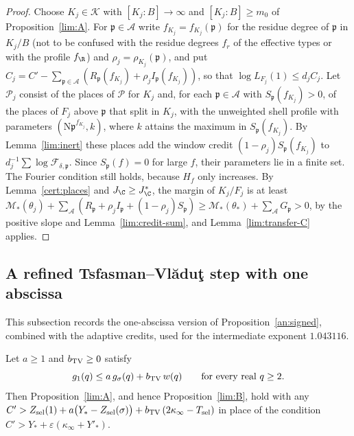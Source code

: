 \begin{proof}
Choose $K_j\in\mathcal K$ with $[K_j:B]\to\infty$ and $[K_j:B]\ge m_0$ of
Proposition~\ref{lim:A}. For $\mathfrak p\in\mathcal A$ write
$f_{K_j}=f_{K_j}(\mathfrak p)$ for the residue degree of $\mathfrak p$ in
$K_j/B$ (not to be confused with the residue degrees $f_r$ of the effective
types or with the profile $f_\R$) and $\rho_j=\rho_{K_j}(\mathfrak p)$, and
put $C_j=C'-\sum_{\mathfrak p\in\mathcal
A}(R_{\mathfrak p}(f_{K_j})+\rho_jI_{\mathfrak p}(f_{K_j}))$, so that $\log
L_{F_j}(1)\le d_jC_j$. Let $\mathcal P_j$ consist of the places of
$\mathcal P$ for $K_j$ and, for each $\mathfrak p\in\mathcal A$ with
$S_{\mathfrak p}(f_{K_j})>0$, of the places of $F_j$ above $\mathfrak p$ that
split in $K_j$, with the unweighted shell profile with parameters
$(\mathrm N\mathfrak p^{f_{K_j}},k)$, where $k$ attains the maximum in
$S_{\mathfrak p}(f_{K_j})$. By Lemma~\ref{lim:inert} these places add the window
credit $(1-\rho_j)S_{\mathfrak p}(f_{K_j})$ to
$d_j^{-1}\sum\log\mathcal F_{\delta,\mathfrak p}$. Since
$S_{\mathfrak p}(f)=0$ for large $f$, their parameters lie in a finite set. The
Fourier condition still holds, because $H_f$ only increases. By
Lemma~\ref{cert:places} and $J_\C\ge J_\C^*$, the margin of $K_j/F_j$ is at
least $\mathcal M_*(\theta_j)+\sum_{\mathcal A}(R_{\mathfrak p}+\rho_j
I_{\mathfrak p}+(1-\rho_j)S_{\mathfrak p})\ge\mathcal M_*(\theta_*)+\sum_{\mathcal A}
G_{\mathfrak p}>0$, by the positive slope and Lemma~\ref{lim:credit-sum}, and
Lemma~\ref{lim:transfer-C} applies.
\end{proof}

\subsection{A refined Tsfasman--Vl\u{a}du\c{t} step with one abscissa}

This subsection records the one-abscissa version of
Proposition~\ref{an:signed}, combined with the adaptive credits, used for the
intermediate exponent $1.043116$.

\begin{proposition}\label{lim:D}
Let $a\ge1$ and $b_{\rm TV}\ge0$ satisfy
\begin{equation}\label{lim:kernel}
 g_1(q)\le a\,g_\sigma(q)+b_{\rm TV}\,w(q)\qquad\text{for every real }q\ge2.
\end{equation}
Then Proposition~\ref{lim:A}, and hence Proposition~\ref{lim:B}, hold with any
$C'>Z_{\rm sel}(1)+a\bigl(Y_*-Z_{\rm sel}(\sigma)\bigr)+b_{\rm TV}\,(2\kappa_\infty-T_{\rm sel})$
in place of the condition $C'>Y_*+\varepsilon(\kappa_\infty+Y'_*)$.
\end{proposition}

